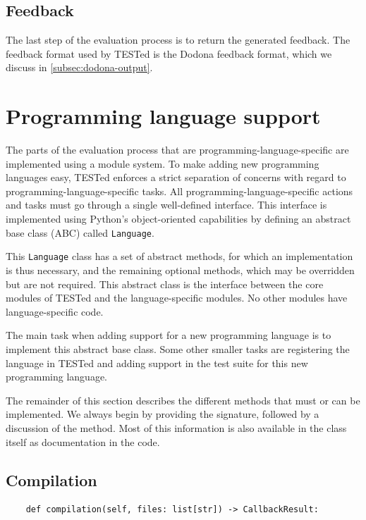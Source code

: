 \documentclass[../main]{subfiles}
\begin{document}
\subsection{Feedback}\label{subsec:feedback}

The last step of the evaluation process is to return the generated feedback.
The feedback format used by TESTed is the Dodona feedback format, which we discuss in \cref{subsec:dodona-output}.

\section{Programming language support}\label{sec:programming-language-support}

The parts of the evaluation process that are programming-language-specific are implemented using a module system.
To make adding new programming languages easy, TESTed enforces a strict separation of concerns with regard to programming-language-specific tasks.
All programming-language-specific actions and tasks must go through a single well-defined interface.
This interface is implemented using Python's object-oriented capabilities by defining an abstract base class (ABC) called \texttt{Language}.

This \texttt{Language} class has a set of abstract methods, for which an implementation is thus necessary, and the remaining optional methods, which may be overridden but are not required.
This abstract class is the interface between the core modules of TESTed and the language-specific modules.
No other modules have language-specific code.

The main task when adding support for a new programming language is to implement this abstract base class.
Some other smaller tasks are registering the language in TESTed and adding support in the test suite for this new programming language.

The remainder of this section describes the different methods that must or can be implemented.
We always begin by providing the signature, followed by a discussion of the method.
Most of this information is also available in the class itself as documentation in the code.

\subsection{Compilation}\label{subsec:impl-compilation}

\begin{verbatim}
    def compilation(self, files: list[str]) -> CallbackResult:
\end{verbatim}
\end{document}
